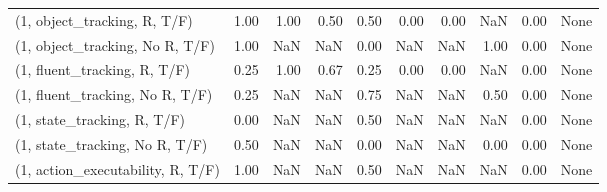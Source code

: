 \begin{table*}[h!]
\begin{adjustbox}{width=2\columnwidth,center}
\begin{tabular}{lrrr|rrr|rrr}
\midrule
(1, object\_tracking, R, T/F)         &                      1.00 &                  1.00 &                      0.50 &                          0.50 &                      0.00 &                          0.00 &                                    NaN &                               0.00 &                                  None \\
(1, object\_tracking, No R, T/F)      &                      1.00 &                   NaN &                       NaN &                          0.00 &                       NaN &                           NaN &                                   1.00 &                               0.00 &                                  None \\
(1, fluent\_tracking, R, T/F)         &                      0.25 &                  1.00 &                      0.67 &                          0.25 &                      0.00 &                          0.00 &                                    NaN &                               0.00 &                                  None \\
(1, fluent\_tracking, No R, T/F)      &                      0.25 &                   NaN &                       NaN &                          0.75 &                       NaN &                           NaN &                                   0.50 &                               0.00 &                                  None \\
(1, state\_tracking, R, T/F)          &                      0.00 &                   NaN &                       NaN &                          0.50 &                       NaN &                           NaN &                                    NaN &                               0.00 &                                  None \\
(1, state\_tracking, No R, T/F)       &                      0.50 &                   NaN &                       NaN &                          0.00 &                       NaN &                           NaN &                                   0.00 &                               0.00 &                                  None \\
(1, action\_executability, R, T/F)    &                      1.00 &                   NaN &                       NaN &                          0.50 &                       NaN &                           NaN &                                    NaN &                               0.00 &                                  None \\

\end{tabular}
\end{adjustbox}
\end{table*}
